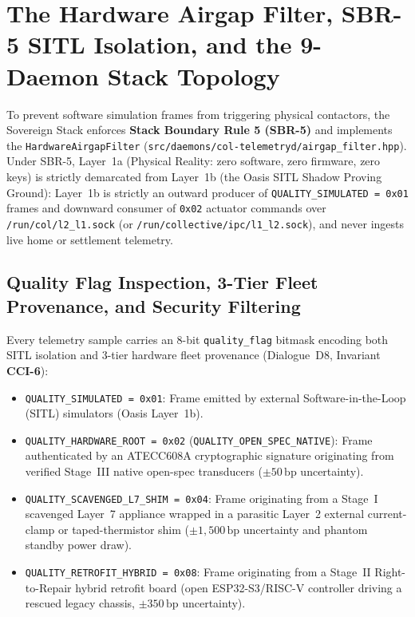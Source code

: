 \section{The Hardware Airgap Filter, SBR-5 SITL Isolation, and the 9-Daemon Stack Topology}

To prevent software simulation frames from triggering physical contactors, the Sovereign Stack enforces \textbf{Stack Boundary Rule 5 (SBR-5)} and implements the \texttt{HardwareAirgapFilter} (\texttt{src/daemons/col-telemetryd/airgap\_filter.hpp}). Under SBR-5, Layer~1a (Physical Reality: zero software, zero firmware, zero keys) is strictly demarcated from Layer~1b (the Oasis SITL Shadow Proving Ground): Layer~1b is strictly an outward producer of \texttt{QUALITY\_SIMULATED = 0x01} frames and downward consumer of \texttt{0x02} actuator commands over \texttt{/run/col/l2\_l1.sock} (or \texttt{/run/collective/ipc/l1\_l2.sock}), and never ingests live home or settlement telemetry.

\subsection{Quality Flag Inspection, 3-Tier Fleet Provenance, and Security Filtering}

Every telemetry sample carries an 8-bit \texttt{quality\_flag} bitmask encoding both SITL isolation and 3-tier hardware fleet provenance (Dialogue~D8, Invariant \textbf{CCI-6}):
\begin{itemize}
    \item \texttt{QUALITY\_SIMULATED = 0x01}: Frame emitted by external Software-in-the-Loop (SITL) simulators (Oasis Layer~1b).
    \item \texttt{QUALITY\_HARDWARE\_ROOT = 0x02} (\texttt{QUALITY\_OPEN\_SPEC\_NATIVE}): Frame authenticated by an ATECC608A cryptographic signature originating from verified Stage~III native open-spec transducers ($\pm 50\,\mathrm{bp}$ uncertainty).
    \item \texttt{QUALITY\_SCAVENGED\_L7\_SHIM = 0x04}: Frame originating from a Stage~I scavenged Layer~7 appliance wrapped in a parasitic Layer~2 external current-clamp or taped-thermistor shim ($\pm 1{,}500\,\mathrm{bp}$ uncertainty and phantom standby power draw).
    \item \texttt{QUALITY\_RETROFIT\_HYBRID = 0x08}: Frame originating from a Stage~II Right-to-Repair hybrid retrofit board (open ESP32-S3/RISC-V controller driving a rescued legacy chassis, $\pm 350\,\mathrm{bp}$ uncertainty).
\end{itemize}

